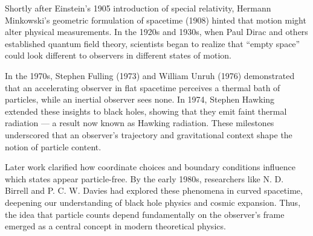\begin{historical}
Shortly after Einstein’s 1905 introduction of special relativity, Hermann Minkowski’s geometric formulation of spacetime (1908) hinted that motion might alter physical measurements. In the 1920s and 1930s, when Paul Dirac and others established quantum field theory, scientists began to realize that “empty space” could look different to observers in different states of motion.

In the 1970s, Stephen Fulling (1973) and William Unruh (1976) demonstrated that an accelerating observer in flat spacetime perceives a thermal bath of particles, while an inertial observer sees none. In 1974, Stephen Hawking extended these insights to black holes, showing that they emit faint thermal radiation — a result now known as Hawking radiation. These milestones underscored that an observer’s trajectory and gravitational context shape the notion of particle content.

Later work clarified how coordinate choices and boundary conditions influence which states appear particle-free. By the early 1980s, researchers like N. D. Birrell and P. C. W. Davies had explored these phenomena in curved spacetime, deepening our understanding of black hole physics and cosmic expansion. Thus, the idea that particle counts depend fundamentally on the observer’s frame emerged as a central concept in modern theoretical physics.
\end{historical}